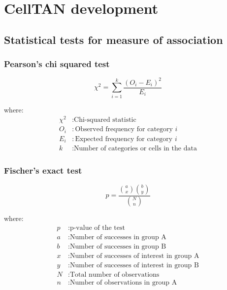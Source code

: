 \chapter{CellTAN development}

\section{Statistical tests for measure of association} \label{ap1:stats}

\subsection{Pearson's chi squared test} \label{ap1:pearsonschi}

\begin{equation}
    \chi^2 = \sum_{i=1}^{k} \frac{(O_i - E_i)^2}{E_i}
\end{equation}
    
where:
\begin{align*}
\chi^2 & : \text{Chi-squared statistic} \\
O_i & : \text{Observed frequency for category } i \\
E_i & : \text{Expected frequency for category } i \\
k & : \text{Number of categories or cells in the data}
\end{align*}


\subsection{Fischer's exact test} \label{ap1:fischer}

\begin{equation}
    p = \frac{{\binom{a}{x} \binom{b}{y}}}{{\binom{N}{n}}}
\end{equation}

where:
\begin{align*}
    p & : \text{p-value of the test} \\
    a & : \text{Number of successes in group A} \\
    b & : \text{Number of successes in group B} \\
    x & : \text{Number of successes of interest in group A} \\
    y & : \text{Number of successes of interest in group B} \\
    N & : \text{Total number of observations} \\
    n & : \text{Number of observations in group A}
\end{align*}


